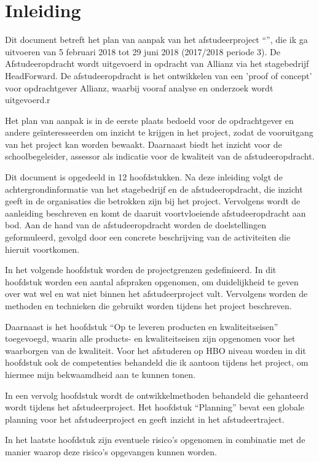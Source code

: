 \chapter{Inleiding}
Dit document betreft het plan van aanpak van het afstudeerproject ``\thesisTitle'', die ik ga uitvoeren van 5 februari 2018 tot 29 juni 2018 (2017/2018 periode 3). De Afstudeeropdracht wordt uitgevoerd in opdracht van Allianz via het stagebedrijf HeadForward. De afstudeeropdracht is het ontwikkelen van een 'proof of concept' voor opdrachtgever Allianz, waarbij vooraf analyse en onderzoek wordt uitgevoerd.\pa r

Het plan van aanpak is in de eerste plaats bedoeld voor de opdrachtgever en andere geïnteresseerden om inzicht te krijgen in het project, zodat de vooruitgang van het project kan worden bewaakt. Daarnaast biedt het inzicht voor de schoolbegeleider, assessor als indicatie voor de kwaliteit van de afstudeeropdracht.\par

Dit document is opgedeeld in 12 hoofdstukken. Na deze inleiding volgt de achtergrondinformatie van het stagebedrijf en de afstudeeropdracht, die inzicht geeft in de organisaties die betrokken zijn bij het project. Vervolgens wordt de aanleiding beschreven en komt de daaruit voortvloeiende afstudeeropdracht aan bod. Aan de hand van de afstudeeropdracht worden de doelstellingen geformuleerd, gevolgd door een concrete beschrijving van de activiteiten die hieruit voortkomen.\par

In het volgende hoofdstuk worden de projectgrenzen gedefinieerd. In dit hoofdstuk worden een aantal afspraken opgenomen, om duidelijkheid te geven over wat wel en wat niet binnen het afstudeerproject valt. Vervolgens worden de methoden en technieken die gebruikt worden tijdens het project beschreven.\par

Daarnaast is het hoofdstuk ``Op te leveren producten en kwaliteitseisen''  toegevoegd, waarin alle products- en kwaliteitseisen zijn opgenomen voor het waarborgen van de kwaliteit. Voor het afstuderen op HBO niveau worden in dit hoofdstuk ook de competenties behandeld die ik aantoon tijdens het project, om hiermee mijn bekwaamdheid aan te kunnen tonen. \par

In een vervolg hoofdstuk wordt de ontwikkelmethoden behandeld die gehanteerd wordt tijdens het afstudeerproject. Het hoofdstuk ``Planning'' bevat een globale planning voor het afstudeerproject en geeft inzicht in het afstudeertraject.\par

In het laatste hoofdstuk zijn eventuele risico's opgenomen in combinatie met de manier waarop deze risico's opgevangen kunnen worden.